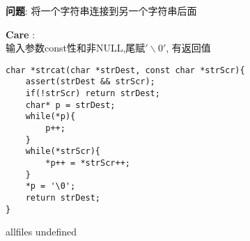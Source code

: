 \documentclass{article}
\begin{document}
\begin{CJK}{UTF8}{gbsn}     %

\else
    
\begin{description}
    \item{\textbf{问题}}: 将一个字符串连接到另一个字符串后面
    \item{\textbf{Care}} : 
	\\输入参数const性和非NULL,尾赋$'\backslash0'$, 有返回值
    \begin{lstlisting}
char *strcat(char *strDest, const char *strScr){
	assert(strDest && strScr);
	if(!strScr)	return strDest;
	char* p = strDest;
	while(*p){
		p++;
	}
	while(*strScr){
		*p++ = *strScr++;
	}
	*p = '\0';
	return strDest;
}
    \end{lstlisting}
\end{description}

\fi

\ifx allfiles undefined
\end{CJK}
\end{document}
